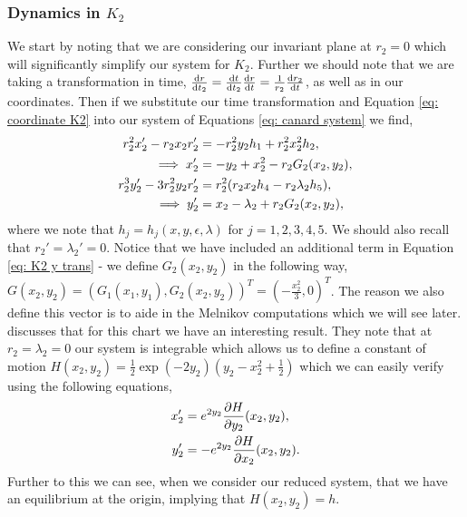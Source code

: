 \subsubsection{Dynamics in \texorpdfstring{$K_2$}{K2}}
We start by noting that we are considering our invariant plane at $r_2=0$ which will significantly simplify our system for $K_2$. Further we should note that we are taking a transformation in time, $\od{r}{t_2}=\od{t}{t_2}\od{r}{t}=\frac{1}{r_2}\od{r_2}{t}$, as well as in our coordinates. Then if we substitute our time transformation and Equation  \ref{eq: coordinate K2} into our system of Equations \ref{eq: canard system} we find, 
\begin{subequations}
	\begin{align}
	r_2^2x_2' - r_2x_2r_2'&=-r_2^2y_2h_1+r^2_2x^2_2h_2,\notag\\
	\implies x'_2&=-y_2+x_2^2-r_2G_2(x_2,y_2),\\
	r^3_2y_2'-3r_2^2y_2r_2'&=r^2_2(r_2x_2h_4-r_2\lambda_2h_5),\notag\\
	\implies y_2'&=x_2-\lambda_2+r_2G_2(x_2,y_2), \label{eq: K2 y trans}
	\end{align}
	\label{eq: reduced canard k2}
\end{subequations}
where we note that $h_j=h_j(x,y,\epsilon,\lambda)$ for $j=1,2,3,4,5$. We should also recall that $r_2'=\lambda_2'=0$. Notice that we have included an additional term in Equation \ref{eq: K2 y trans} - we define $G_2(x_2,y_2)$ in the following way, $G(x_2,y_2)=(G_1(x_1,y_1),G_2(x_2,y_2))^T=(-\frac{x^2_2}{3},0)^T$. The reason we also define this vector is to aide in the Melnikov computations which we will see later. \citet{krupa2001} discusses that for this chart we have an interesting result. They note that at $r_2=\lambda_2=0$ our system is integrable which allows us to define a constant of motion $H(x_2,y_2)=\frac{1}{2}\exp{(-2y_2)}\left(y_2-x^2_2+\frac{1}{2}\right)$ which we can easily verify \citep{krupa2001} using the following equations,
\begin{align*}
x'_2&=e^{2y_2}\pd{H}{y_2}(x_2,y_2),\\
y_2'&=-e^{2y_2}\pd{H}{x_2}(x_2,y_2).
\end{align*}
Further to this we can see, when we consider our reduced system, that we have an equilibrium at the origin, implying that $H(x_2,y_2)=h$.
